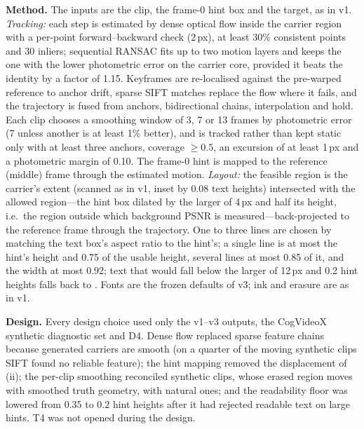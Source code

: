\textbf{Method.} The inputs are the clip, the frame-0 hint box and the target, as in v1. \emph{Tracking:} each step is estimated by dense optical flow inside the carrier region with a per-point forward--backward check (2\,px), at least 30\% consistent points and 30 inliers; sequential RANSAC fits up to two motion layers and keeps the one with the lower photometric error on the carrier core, provided it beats the identity by a factor of 1.15. Keyframes are re-localised against the pre-warped reference to anchor drift, sparse SIFT matches replace the flow where it fails, and the trajectory is fused from anchors, bidirectional chains, interpolation and hold. Each clip chooses a smoothing window of 3, 7 or 13 frames by photometric error (7 unless another is at least 1\% better), and is tracked rather than kept static only with at least three anchors, coverage $\geq 0.5$, an excursion of at least 1\,px and a photometric margin of 0.10. The frame-0 hint is mapped to the reference (middle) frame through the estimated motion. \emph{Layout:} the feasible region is the carrier's extent (scanned as in v1, inset by 0.08 text heights) intersected with the allowed region---the hint box dilated by the larger of 4\,px and half its height, i.e.\ the region outside which background PSNR is measured---back-projected to the reference frame through the trajectory. One to three lines are chosen by matching the text box's aspect ratio to the hint's; a single line is at most the hint's height and 0.75 of the usable height, several lines at most 0.85 of it, and the width at most 0.92; text that would fall below the larger of 12\,px and 0.2 hint heights falls back to \method. Fonts are the frozen defaults of v3; ink and erasure are as in v1.

\textbf{Design.} Every design choice used only the v1--v3 outputs, the CogVideoX synthetic diagnostic set and D4. Dense flow replaced sparse feature chains because generated carriers are smooth (on a quarter of the moving synthetic clips SIFT found no reliable feature); the hint mapping removed the displacement of (ii); the per-clip smoothing reconciled synthetic clips, whose erased region moves with smoothed truth geometry, with natural ones; and the readability floor was lowered from 0.35 to 0.2 hint heights after it had rejected readable text on large hints. T4 was not opened during the design.

